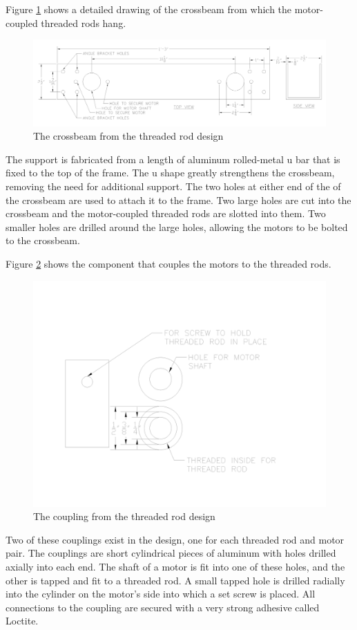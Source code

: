 \documentclass[11pt]{article}
\begin{document}
Figure \ref{fig:threaded rod crossbeam} shows a detailed drawing of the crossbeam from which the motor-coupled threaded rods hang.

\begin{figure}[H]
  \centering
  \includegraphics[width=\linewidth]{res/threaded_rod_crossbeam.png}
  \caption{The crossbeam from the threaded rod design}
  \label{fig:threaded rod crossbeam}
\end{figure}

The support is fabricated from a length of aluminum rolled-metal u bar that is fixed to the top of the frame.
The u shape greatly strengthens the crossbeam, removing the need for additional support.
The two holes at either end of the of the crossbeam are used to attach it to the frame.
Two large holes are cut into the crossbeam and the motor-coupled threaded rods are slotted into them.
Two smaller holes are drilled around the large holes, allowing the motors to be bolted to the crossbeam.

Figure \ref{fig:threaded rod coupling} shows the component that couples the motors to the threaded rods.

\begin{figure}[H]
  \centering
  \includegraphics[width=0.6\linewidth]{res/threaded_rod_coupling.png}
  \caption{The coupling from the threaded rod design}
  \label{fig:threaded rod coupling}
\end{figure}

Two of these couplings exist in the design, one for each threaded rod and motor pair.
The couplings are short cylindrical pieces of aluminum with holes drilled axially into each end.
The shaft of a motor is fit into one of these holes, and the other is tapped and fit to a threaded rod.
A small tapped hole is drilled radially into the cylinder on the motor’s side into which a set screw is placed.
All connections to the coupling are secured with a very strong adhesive called Loctite.
\end{document}
